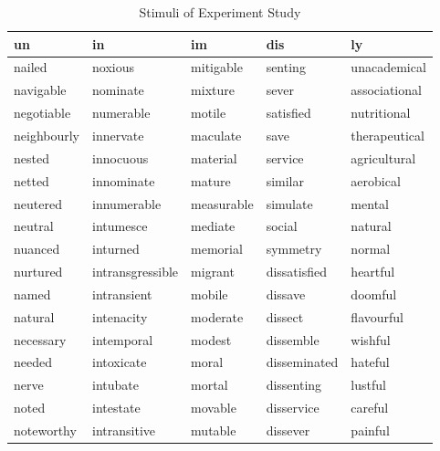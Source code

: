 \begin{longtabu} to \textwidth {XXXXX}

					\caption{Stimuli of Experiment Study}
			\label{Stimuli of Experiment Study}
			
				\endfirsthead
			\endhead
			\hline
	\textbf{un}   & \textbf{in}      & \textbf{im}     & \textbf{dis}   & \textbf{ly}     \\
	\hline
	nailed        & noxious          & mitigable       & senting        & unacademical    \\
	navigable     & nominate         & mixture         & sever          & associational   \\
	negotiable    & numerable        & motile          & satisfied      & nutritional     \\
	neighbourly   & innervate        & maculate        & save           & therapeutical   \\
	nested        & innocuous        & material        & service        & agricultural    \\
					netted        & innominate       & mature          & similar        & aerobical       \\
					neutered      & innumerable      & measurable      & simulate       & mental          \\
	neutral       & intumesce        & mediate         & social         & natural         \\
	nuanced       & inturned         & memorial        & symmetry       & normal          \\		
				nurtured      & intransgressible & migrant         & dissatisfied   & heartful        \\
				named         & intransient      & mobile          & dissave        & doomful         \\
				natural       & intenacity       & moderate        & dissect        & flavourful      \\
				necessary     & intemporal       & modest          & dissemble      & wishful         \\
				needed        & intoxicate       & moral           & disseminated   & hateful         \\
				nerve         & intubate         & mortal          & dissenting     & lustful         \\
				noted         & intestate        & movable         & disservice     & careful         \\
				noteworthy    & intransitive     & mutable         & dissever       & painful         \\

\end{longtabu}
